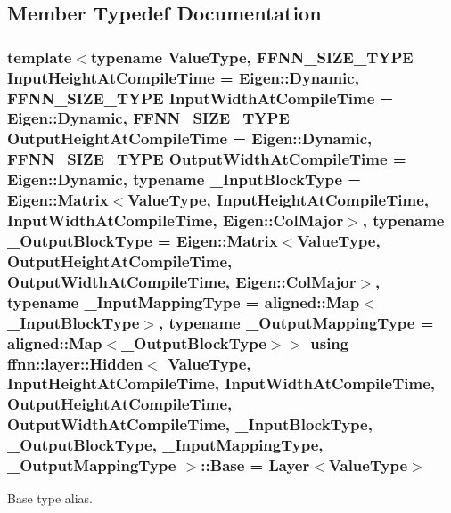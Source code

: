 \subsection{Member Typedef Documentation}
\hypertarget{classffnn_1_1layer_1_1_hidden_ac51b180aa7de47794148e32616f0441f}{
\subsubsection[{Base}]{\setlength{\rightskip}{0pt plus 5cm}template$<$typename Value\-Type, F\-F\-N\-N\-\_\-\-S\-I\-Z\-E\-\_\-\-T\-Y\-P\-E Input\-Height\-At\-Compile\-Time = Eigen\-::\-Dynamic, F\-F\-N\-N\-\_\-\-S\-I\-Z\-E\-\_\-\-T\-Y\-P\-E Input\-Width\-At\-Compile\-Time = Eigen\-::\-Dynamic, F\-F\-N\-N\-\_\-\-S\-I\-Z\-E\-\_\-\-T\-Y\-P\-E Output\-Height\-At\-Compile\-Time = Eigen\-::\-Dynamic, F\-F\-N\-N\-\_\-\-S\-I\-Z\-E\-\_\-\-T\-Y\-P\-E Output\-Width\-At\-Compile\-Time = Eigen\-::\-Dynamic, typename \-\_\-\-Input\-Block\-Type = Eigen\-::\-Matrix$<$\-Value\-Type, Input\-Height\-At\-Compile\-Time, Input\-Width\-At\-Compile\-Time, Eigen\-::\-Col\-Major$>$, typename \-\_\-\-Output\-Block\-Type = Eigen\-::\-Matrix$<$\-Value\-Type, Output\-Height\-At\-Compile\-Time, Output\-Width\-At\-Compile\-Time, Eigen\-::\-Col\-Major$>$, typename \-\_\-\-Input\-Mapping\-Type = aligned\-::\-Map$<$\-\_\-\-Input\-Block\-Type$>$, typename \-\_\-\-Output\-Mapping\-Type = aligned\-::\-Map$<$\-\_\-\-Output\-Block\-Type$>$$>$ using {\bf ffnn\-::layer\-::\-Hidden}$<$ Value\-Type, Input\-Height\-At\-Compile\-Time, Input\-Width\-At\-Compile\-Time, Output\-Height\-At\-Compile\-Time, Output\-Width\-At\-Compile\-Time, \-\_\-\-Input\-Block\-Type, \-\_\-\-Output\-Block\-Type, \-\_\-\-Input\-Mapping\-Type, \-\_\-\-Output\-Mapping\-Type $>$\-::{\bf Base} =  {\bf Layer}$<$Value\-Type$>$}}\label{classffnn_1_1layer_1_1_hidden_ac51b180aa7de47794148e32616f0441f}


Base type alias. 

